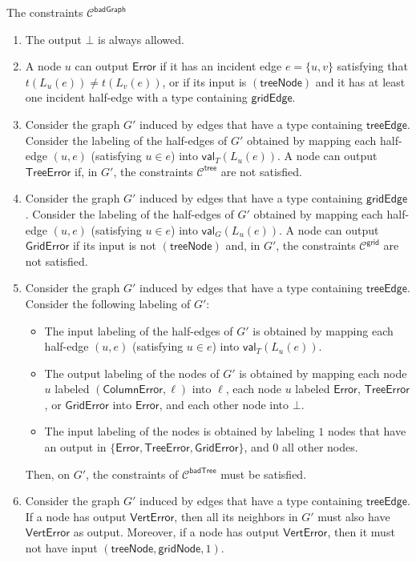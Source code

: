 \documentclass[11pt]{article}
\newcommand{\lerror}{\mathsf {Error}}
\newcommand{\lgriderror}{\mathsf {GridError}}
\newcommand{\lverterror}{\mathsf {VertError}}
\newcommand{\ltreeerror}{\mathsf {TreeError}}
\newcommand{\lcolumnerror}{\mathsf {ColumnError}}
\newcommand{\lgridedge}{\mathsf {gridEdge}}
\newcommand{\lgridnode}{\mathsf {gridNode}}
\newcommand{\ltreenode}{\mathsf {treeNode}}
\newcommand{\ltreeedge}{\mathsf {treeEdge}}
\newcommand{\lgrid}{\mathsf {grid}}
\newcommand{\ltreelike}{\mathsf {tree}}
\newcommand{\lbadtree}{\mathsf {badTree}}
\newcommand{\lbadgraph}{\mathsf {badGraph}}
\newcommand{\fvaluegrid}{\mathsf{val}_G}
\newcommand{\fvaluetree}{\mathsf{val}_T}
\begin{document}
\begin{myframe}{The constraints $\mathcal{C}^{\lbadgraph}$}
\begin{enumerate}
	\item The output $\bot$ is always allowed.
	\item A node $u$ can output $\lerror$ if it has an incident edge $e = \{u,v\}$ satisfying that 
	$t(L_u(e)) \neq t(L_v(e))$, or if its input is $(\ltreenode)$ and it has at least one incident half-edge with a type containing $\lgridedge$.\label{constr:badgraph:error}
	\item Consider the graph $G'$ induced by edges that have a type containing $\ltreeedge$. Consider the labeling of the half-edges of $G'$ obtained by mapping each half-edge $(u,e)$ (satisfying $u \in e$) into $\fvaluetree(L_u(e))$. A node can output $\ltreeerror$ if, in $G'$,  the constraints $\mathcal{C}^{\ltreelike}$ are not satisfied.\label{constr:badgraph:treeerror}
	\item Consider the graph $G'$ induced by edges that have a type containing $\lgridedge$. Consider the labeling of the half-edges of $G'$ obtained by mapping each half-edge $(u,e)$ (satisfying $u \in e$) into $\fvaluegrid(L_u(e))$. A node can output $\lgriderror$ if its input is not $(\ltreenode)$ and, in $G'$,  the constraints $\mathcal{C}^{\lgrid}$ are not satisfied.\label{constr:badgraph:griderror}
	\item Consider the graph $G'$ induced by edges that have a type containing $\ltreeedge$. Consider the following labeling of $G'$: \label{constr:badgraph:badtree}
	\begin{itemize}
		\item The input labeling of the half-edges of $G'$ is obtained by mapping each half-edge $(u,e)$ (satisfying $u \in e$) into $\fvaluetree(L_u(e))$.
		\item The output labeling of the nodes of $G'$ is obtained by mapping each node $u$ labeled $(\lcolumnerror,\ell)$ into $\ell$, each node $u$ labeled $\lerror$, $\ltreeerror$, or $\lgriderror$ into $\lerror$, and each other node into $\bot$.
		\item The input labeling of the nodes is obtained by labeling $1$ nodes that have an output in $\{\lerror, \ltreeerror, \lgriderror\}$, and $0$ all other nodes.
	\end{itemize}
	Then, on $G'$, the constraints of $\mathcal{C}^{\lbadtree}$ must be satisfied.
	\item Consider the graph $G'$ induced by edges that have a type containing $\ltreeedge$. If a node has output $\lverterror$, then all its neighbors in $G'$ must also have $\lverterror$ as output. Moreover, if a node has output $\lverterror$, then it must not have input $(\ltreenode,\lgridnode,1)$. \label{constr:badgraph:verterror}
\end{enumerate}
\end{myframe}
\end{document}
